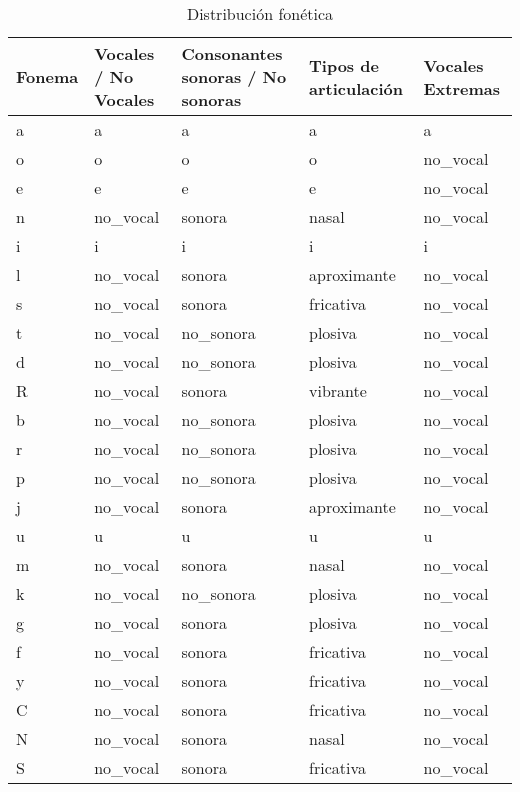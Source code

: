 \begin{table}[H]
\centering
\caption{Distribución fonética}
\label{tab:transformacion_fonetica_arboles}
\begin{tabular}{|l|l|l|l|l|}
\hline
\textbf{Fonema} & \multicolumn{1}{|p{2.5cm}|}{\textbf{Vocales / No Vocales}} &  \multicolumn{1}{|p{3cm}|}{\textbf{Consonantes sonoras / No sonoras}} &  \multicolumn{1}{|p{2.4cm}|}{\textbf{Tipos de articulación}} & \multicolumn{1}{|p{2.4cm}|}{\textbf{Vocales Extremas}} \\\hline
a   & a         & a          & a           & a         \\ \hline
o   & o         & o          & o           & no\_vocal \\ \hline
e   & e         & e          & e           & no\_vocal \\ \hline
n   & no\_vocal & sonora     & nasal       & no\_vocal \\ \hline
i   & i         & i          & i           & i         \\ \hline
l   & no\_vocal & sonora     & aproximante & no\_vocal \\ \hline
s   & no\_vocal & sonora     & fricativa   & no\_vocal \\ \hline
t   & no\_vocal & no\_sonora & plosiva     & no\_vocal \\ \hline
d   & no\_vocal & no\_sonora & plosiva     & no\_vocal \\ \hline
R   & no\_vocal & sonora     & vibrante    & no\_vocal \\ \hline
b   & no\_vocal & no\_sonora & plosiva     & no\_vocal \\ \hline
r   & no\_vocal & no\_sonora & plosiva     & no\_vocal \\ \hline
p   & no\_vocal & no\_sonora & plosiva     & no\_vocal \\ \hline
j   & no\_vocal & sonora     & aproximante & no\_vocal \\ \hline
u   & u         & u          & u           & u         \\ \hline
m   & no\_vocal & sonora     & nasal       & no\_vocal \\ \hline
k   & no\_vocal & no\_sonora & plosiva     & no\_vocal \\ \hline
g   & no\_vocal & sonora     & plosiva     & no\_vocal \\ \hline
f   & no\_vocal & sonora     & fricativa   & no\_vocal \\ \hline
y   & no\_vocal & sonora     & fricativa   & no\_vocal \\ \hline
C   & no\_vocal & sonora     & fricativa   & no\_vocal \\ \hline
N   & no\_vocal & sonora     & nasal       & no\_vocal \\ \hline
S   & no\_vocal & sonora     & fricativa   & no\_vocal \\ \hline
\end{tabular}
\end{table}